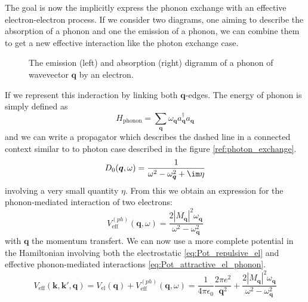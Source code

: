 \documentclass[../main.tex]{subfile}
\begin{document}
The goal is now the implicitly express the phonon exchange with an effective electron-electron process. If we consider two diagrams, one aiming to describe the absorption of a phonon
and one the emission of a phonon, we can combine them to get a new effective interaction like the photon exchange case.
\begin{figure}[H]
    \centering
     \hspace{2cm}
    \caption{The emission (left) and absorption (right) digramm of a phonon of wavevector $\bm{q}$ by an electron.}
    \end{figure}
If we represent this inderaction by linking both $\bm{q}$-edges. The energy of phonon is simply defined as
\[
    H_{\text{phonon}} = \sum_{\bm{q}} \omega_{\bm{q}} a_{\bm{q}}^{\dagger}a_{\bm{q}}
\]
and we can write a propagator which describes the dashed line in a connected context similar to to photon case described in the figure \ref{ref:photon_exchange}.
\[
    D_0(\bm{q},\omega) = \frac{1}{\omega^2 - \omega_{\bm{q}}^2 + \im \eta}
\]
involving a very small quantity $\eta$. From this  we obtain an expression for the phonon-mediated interaction of two electrons:
\begin{equation}\label{eq:Pot_attractive_el_phonon}
    V^{(ph)}_{\text{eff}}(\bm{q},\omega) = \frac{2|M_{\bm{q}}|^2\omega_{\bm{q}}}{\omega^2 - \omega_{\bm{q}}^2}
\end{equation}
with $\bm{q}$ the momentum transfert.
We can now use a more complete potential in the Hamiltonian involving both the electrostatic \ref{eq:Pot_repulsive_el} and effective phonon-mediated interactions \ref{eq:Pot_attractive_el_phonon}.
\begin{equation}
    V_{\text{eff}}(\bm{k},\bm{k}',\bm{q}) =  V_{\text{el}}(\bm{q}) + V^{(ph)}_{\text{eff}}(\bm{q},\omega) \label{eq:V_eff} = \frac{1}{4\pi\epsilon_0} \frac{2\pi e^2}{\bm{q}^2} + \frac{2|M_{\bm{q}}|^2\omega_{\bm{q}}}{\omega^2 - \omega_{\bm{q}}^2}
\end{equation}
\end{document}
